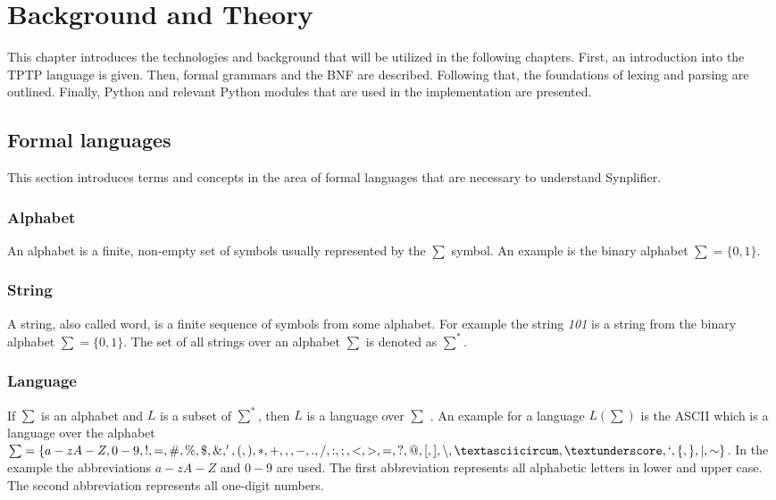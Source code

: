 
\chapter{Background and Theory}\label{cha:Background}

This chapter introduces the technologies and background that will be utilized in the following chapters. First, an introduction into the \ac{TPTP} language is given. Then, formal grammars and the \ac{BNF} are described. Following that, the foundations of lexing and parsing are outlined. Finally, Python and relevant Python modules that are used in the implementation are presented.

\section{Formal languages}\label{sec:BackgroundFormalLanguage}

This section introduces terms and concepts in the area of formal languages that are necessary to understand \ac{Synplifier}.

\subsection{Alphabet}
An alphabet is a finite, non-empty set of symbols usually represented by the $\sum$ symbol.
An example is the binary alphabet $\sum = \{0,1\}$. \cite{AutomataTheory.2007}

\subsection{String}
A string, also called word, is a finite sequence of symbols from some alphabet. For example the string \textit{101} is a string from the binary alphabet $\sum = \{0,1\}$.
The set of all strings over an alphabet $\sum$ is denoted as $\sum ^{*}$. \cite{AutomataTheory.2007}

\subsection{Language}
If $\sum$ is an alphabet and $L$ is a subset of $\sum ^*$, then $L$ is a language over $\sum$ \cite{AutomataTheory.2007}.
An example for a language $L(\sum)$ is the \ac{ASCII} which is a language over the alphabet $\sum = \{a-zA-Z,0-9,!,=,\#,\%,\$,\&,',(,),*,+,,,-,.,/,:,;,<,>,=,?,@,[,],\backslash ,\textasciicircum ,\textunderscore ,`,\{,\},\mid,\sim\}$. In the example the abbreviations $a-zA-Z$ and $0-9$ are used. The first abbreviation represents all alphabetic letters in lower and upper case. The second abbreviation represents all one-digit numbers.

